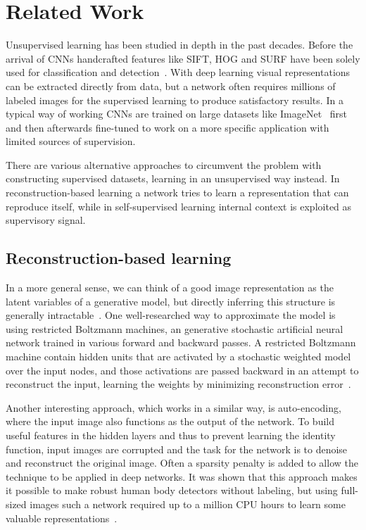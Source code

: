 %
\chapter{Related Work}
\label{ch:related_work}
Unsupervised learning has been studied in depth in the past decades. Before the arrival of CNNs handcrafted features like SIFT, HOG and SURF have been solely used for classification and detection~\cite{lee2017}. With deep learning visual representations can be extracted directly from data, but a network often requires millions of labeled images for the supervised learning to produce satisfactory results. In a typical way of working CNNs are trained on large datasets like ImageNet~\cite{deng2009} first and then afterwards fine-tuned to work on a more specific application with limited sources of supervision. 

There are various alternative approaches to circumvent the problem with constructing supervised datasets, learning in an unsupervised way instead. In reconstruction-based learning a network tries to learn a representation that can reproduce itself, while in self-supervised learning internal context is exploited as supervisory signal.

\section{Reconstruction-based learning}
In a more general sense, we can think of a good image representation as the latent variables of a generative model, but directly inferring this structure is generally intractable~\cite{doersch2015}. One well-researched way to approximate the model is using restricted Boltzmann machines, an generative stochastic artificial neural network trained in various forward and backward passes. A restricted Boltzmann machine contain hidden units that are activated by a stochastic weighted model over the input nodes, and those activations are passed backward in an attempt to reconstruct the input, learning the weights by minimizing reconstruction error~\cite{smolensky1986}. 

Another interesting approach, which works in a similar way, is auto-encoding, where the input image also functions as the output of the network. To build useful features in the hidden layers and thus to prevent learning the identity function, input images are corrupted and the task for the network is to denoise and reconstruct the original image. Often a sparsity penalty is added to allow the technique to be applied in deep networks. It was shown that this approach makes it possible to make robust human body detectors without labeling, but using full-sized images such a network required up to a million CPU hours to learn some valuable representations~\cite{le2013}.  

